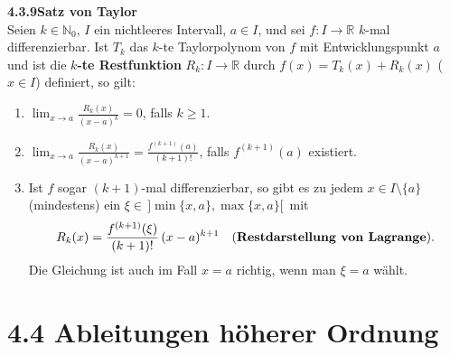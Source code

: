 \documentclass[a4paper,12pt]{article}
\newcommand{\gentry}[3]{%
  \noindent\textbf{#1\quad #2}\nopagebreak\\[0.2em]
  #3\par\smallskip
}
\begin{document}
\gentry{4.3.9}{Satz von Taylor}{%
  Seien $k \in \mathbb{N}_0$, $I$ ein nichtleeres Intervall, $a \in I$, und sei
  $f: I \to \mathbb{R}$ $k$-mal differenzierbar. Ist $T_k$ das $k$-te Taylorpolynom von $f$
  mit Entwicklungspunkt $a$ und ist die \textbf{$k$-te Restfunktion} $R_k: I \to \mathbb{R}$
  durch $f(x) = T_k(x) + R_k(x)$ ($x \in I$) definiert, so gilt:
  \begin{enumerate}[label=(\roman*),topsep=2pt,itemsep=1pt]
    \item $\displaystyle \lim_{x \to a} \frac{R_k(x)}{(x-a)^k} = 0$, falls $k \geq 1$.
    \item $\displaystyle \lim_{x \to a} \frac{R_k(x)}{(x-a)^{k+1}} = \frac{f^{(k+1)}(a)}{(k+1)!}$,
          falls $f^{(k+1)}(a)$ existiert.
    \item Ist $f$ sogar $(k+1)$-mal differenzierbar, so gibt es zu jedem $x \in I \setminus \{a\}$
          (mindestens) ein $\xi \in \,]\min\{x, a\}, \max\{x, a\}[\,$ mit
          \[
            R_k(x) = \frac{f^{(k+1)}(\xi)}{(k+1)!}\,(x-a)^{k+1} \quad \text{(\textbf{Restdarstellung von Lagrange}).}
          \]
          Die Gleichung ist auch im Fall $x = a$ richtig, wenn man $\xi = a$ wählt.
  \end{enumerate}
}

\section*{4.4 \quad Ableitungen höherer Ordnung}
\end{document}
